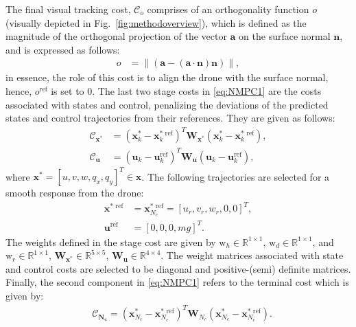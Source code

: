 The final visual tracking cost, $\mathcal{C}_{o}$ comprises of an orthogonality function $o$ (visually depicted in Fig.~\ref{fig:methodoverview}), which is defined as the magnitude of the orthogonal projection of the vector $\mathbf{a}$ on the surface normal $\mathbf{n}$, and is expressed as follows:
%
\begin{align}\label{eq:orth_functon}
    o &= \|(\mathbf{a}-(\mathbf{a}\cdot \mathbf{n} )\mathbf{n})\|,
\end{align}
%
in essence, the role of this cost is to align the drone with the surface normal, hence, $o^{\textrm{ref}}$ is set to $0$. The last two stage costs in \eqref{eq:NMPC1} are the costs associated with states and control, penalizing the deviations of the predicted states and control trajectories from their references. They are given as follows:
%
\begin{align} \label{eq:NMPC1_stageCostStateControl}
	\mathcal{C}_{\mathbf{x}^{\textrm{*}}} &= (\mathbf{x}_k^{\textrm{*}} - \mathbf{x}_k^{\textrm{* ref}})^T\mathbf{W}_{\mathbf{x}^{\textrm{*}}}(\mathbf{x}_k^{\textrm{*}} - \mathbf{x}_k^{\textrm{* ref}}), \\
	\mathcal{C}_{\mathbf{u}} &= (\mathbf{u}_k - \mathbf{u}_k^{\textrm{ref}})^T\mathbf{W}_{\mathbf{u}}(\mathbf{u}_k - \mathbf{u}_k^{\textrm{ref}}),
\end{align}
%
where $\mathbf{x}^{\textrm{*}} = [u,v,w, q_x,q_y]^T \in \mathbf{x}$. The following trajectories are selected for a smooth response from the drone:
%
\begin{align} 
	\mathbf{x}^{\textrm{* ref}} &= \mathbf{x}_{N_c}^{\textrm{* ref}} =  \left[u_r,v_r,w_r,0,0 \right]^T, \label{eq:ref_x_NMPC} \\ 
	\mathbf{u}^{\textrm{ref}} &=  \left[0,0,0, mg \right]^T. \label{eq:ref_u_NMPC}
\end{align}
%
The weights defined in the stage cost are given by $ \mathrm{w}_{h} \in \mathbb{R}^{1 \times 1} $, $\mathrm{w}_{d} \in \mathbb{R}^{1 \times 1}$, and $  \mathrm{w}_{r} \in \mathbb{R}^{1 \times 1} $, $ \mathbf{W}_{\mathbf{x}^{\textrm{*}}} \in \mathbb{R}^{5 \times 5} $, $  \mathbf{W}_{\mathbf{u}} \in \mathbb{R}^{4 \times 4}$. The weight matrices associated with state and control costs are selected to be diagonal and positive-(semi) definite matrices. 
Finally, the second component in \eqref{eq:NMPC1} refers to the terminal cost which is given by: 
%
\begin{align} \label{eq:NMPC1_terminalCost}
	& \mathcal{C}_{\mathbf{N_c}} = (\mathbf{x}_{N_c}^{\textrm{*}} - \mathbf{x}_{N_c}^{\textrm{* ref}})^T\mathbf{W}_{N_c}(\mathbf{x}_{N_c}^{\textrm{*}} - \mathbf{x}_{N_c}^{\textrm{* ref}}).
\end{align}
